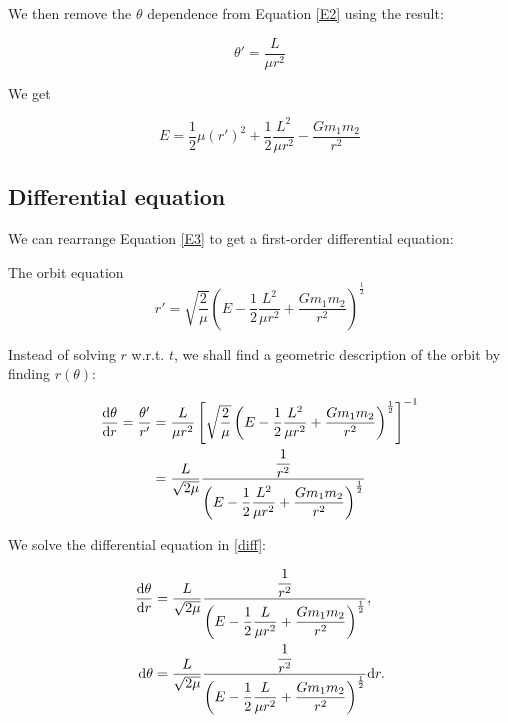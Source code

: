 \begin{frame}{\subsecname}

We then remove the \(\theta\) dependence from Equation \ref{E2} using the result:

\begin{equation}
\theta' = \frac{L}{\mu r^2}
\end{equation}

We get

\begin{equation}
E = \frac{1}{2}\mu (r')^2 + \frac{1}{2} \frac{L^2}{\mu r^2} - \frac{Gm_1m_2}{r^2} \label{E3}
\end{equation}

\end{frame}

\subsection{Differential equation}

\begin{frame}{\subsecname}
We can rearrange Equation \ref{E3} to get a first-order differential equation:

\begin{block}{The orbit equation}
\begin{equation}
r' = \sqrt{\frac{2}{\mu}}\left( E - \frac{1}{2}\frac{L^2}{\mu r^2} + \frac{Gm_1m_2}{r^2} \right)^{\frac{1}{2}}
\end{equation}
\end{block}

\end{frame}

\begin{frame}{\subsecname}

Instead of solving \(r\) w.r.t. \(t\), we shall find a geometric description of the orbit by finding \(r(\theta)\):

\begin{align}
\dv{\theta}{r} = \frac{\theta'}{r'} &= \frac{L}{\mu r^2} \left[\sqrt{\frac{2}{\mu}}\left( E - \frac{1}{2}\frac{L^2}{\mu r^2} + \frac{Gm_1m_2}{r^2} \right)^{\frac{1}{2}}\right]^{-1} \\
&= \frac{L}{\sqrt{2\mu}} \frac{\dfrac{1}{r^2}}{\left( E - \dfrac{1}{2}\dfrac{L^2}{\mu r^2} + \dfrac{Gm_1m_2}{r^2} \right)^{\frac{1}{2}}} \label{diff}
\end{align}

\end{frame}

\begin{frame}{\subsecname}

We solve the differential equation in \eqref{diff}:

\begin{align}
\dv{\theta}{r} &= \frac{L}{\sqrt{2\mu}} \frac{\dfrac{1}{r^2}}{\left( E - \dfrac{1}{2}\dfrac{L}{\mu r^2} + \dfrac{Gm_1m_2}{r^2} \right)^{\frac{1}{2}}},\\
\dd \theta &= \frac{L}{\sqrt{2\mu}} \frac{\dfrac{1}{r^2}}{\left( E - \dfrac{1}{2}\dfrac{L}{\mu r^2} + \dfrac{Gm_1m_2}{r^2} \right)^{\frac{1}{2}}} \dd r.
\end{align}

\end{frame}

